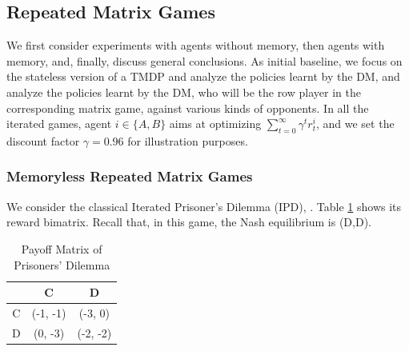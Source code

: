 \iffalse
\subsection{Repeated Matrix Games}
We first consider experiments with agents without memory,
then agents with memory, and, finally, discuss general conclusions.
As initial baseline, we focus on the stateless version of a TMDP and
analyze the policies learnt by the DM, and analyze the policies learnt by the DM,
who will be the row player in the corresponding matrix game, against various kinds of opponents.
In all the iterated games, agent  $ i \in \lbrace A, B \rbrace $ 
aims at optimizing 
$\sum_{t=0}^{\infty} \gamma^t r^i_{t}$, and we set 
the discount factor $\gamma = 0.96$ for illustration purposes. 
\subsubsection{Memoryless Repeated Matrix Games}\label{kk2}

We consider the classical Iterated Prisoner's Dilemma (IPD), \parencite{axelrod84}. Table \ref{tab:payoffIPD} shows its reward bimatrix. %
 Recall that, in this game, the Nash equilibrium is (D,D).

\begin{table}[h]
\begin{center}
\begin{tabular}{c|c|c}
\hline
 & C & D \\
\hline
C & (-1, -1) & (-3, 0) \\
\hline
D & (0, -3) & (-2, -2)  \\
\hline
\end{tabular}
\end{center}
\caption{Payoff Matrix of Prisoners' Dilemma}
\label{tab:payoffIPD}
\vspace{-2ex}
\end{table}

%

